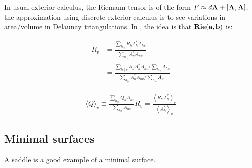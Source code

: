 In usual exterior calculus, the Riemann tensor is of the form
$F \approx d\bf{A} + \bf{[A,A]}$; the approximation using
discrete exterior calculus is to see variations in area/volume
in Delaunay triangulations. In \cite{exterior_calculus1},
the idea is that $\bf{Rie(a,b)}$ is:

\begin{align*}
R_v&=\frac{\sum_{h_{\mid v}} R_h A_h^* A_{h v}}{\sum_{h_{\mid v}} A_h^* A_{h v}} \\
 &=\frac{\sum_{h \mid v} R_h A_h^* A_{h v} / \sum_{h_{\mid v}} A_{h v}}{\sum_{h_{\mid v}} A_h^* A_{h v} / \sum_{h_{\mid v}} A_{h v}}
\end{align*}

\begin{align*}
\langle Q\rangle_v \equiv \frac{\sum_{h_{\mid v}} Q_h A_{h v}}{\sum_{h_{\mid v}} A_{h v}}
R_v=\frac{\left\langle R_h A_h^*\right\rangle_v}{\left\langle A_h^*\right\rangle_v}
\end{align*}

\subsection{Minimal surfaces}

A saddle is a good example of a minimal surface.
\cite{bouma2001}